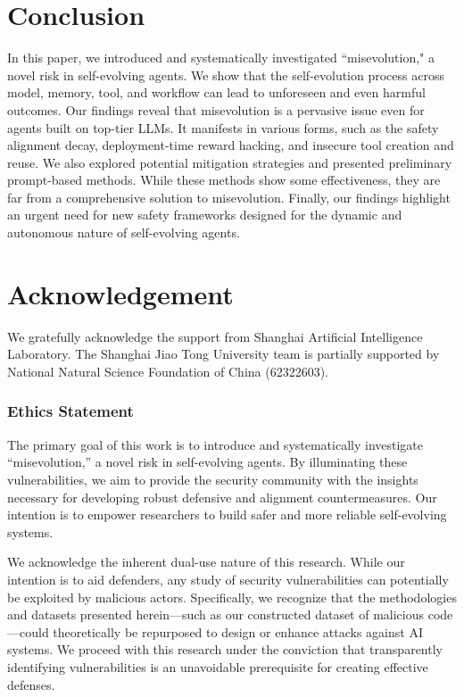 \documentclass{article} %
\begin{document}
\section{Conclusion}

In this paper, we introduced and systematically investigated ``misevolution," a novel risk in self-evolving agents. We show that the self-evolution process across model, memory, tool, and workflow can lead to unforeseen and even harmful outcomes. Our findings reveal that misevolution is a pervasive issue even for agents built on top-tier LLMs. It manifests in various forms, such as the safety alignment decay, deployment-time reward hacking, and insecure tool creation and reuse. We also explored potential mitigation strategies and presented preliminary prompt-based methods. While these methods show some effectiveness, they are far from a comprehensive solution to misevolution. Finally, our findings highlight an urgent need for new safety frameworks designed for the dynamic and autonomous nature of self-evolving agents.


\section*{Acknowledgement}
We gratefully acknowledge the support from Shanghai Artificial Intelligence Laboratory. The Shanghai Jiao Tong University team is partially supported by National Natural Science Foundation of China (62322603).

\subsubsection*{Ethics Statement}
\label{sec:ethics_statement}
The primary goal of this work is to introduce and systematically investigate ``misevolution,'' a novel risk in self-evolving agents. By illuminating these vulnerabilities, we aim to provide the security community with the insights necessary for developing robust defensive and alignment countermeasures. Our intention is to empower researchers to build safer and more reliable self-evolving systems.

We acknowledge the inherent dual-use nature of this research. While our intention is to aid defenders, any study of security vulnerabilities can potentially be exploited by malicious actors. Specifically, we recognize that the methodologies and datasets presented herein---such as our constructed dataset of malicious code---could theoretically be repurposed to design or enhance attacks against AI systems. We proceed with this research under the conviction that transparently identifying vulnerabilities is an unavoidable prerequisite for creating effective defenses.
\end{document}
